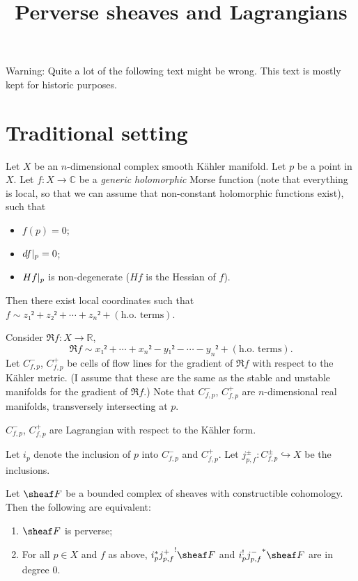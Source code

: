 \documentclass[english]{short-notes}
\title{Perverse sheaves and Lagrangians}
\newcommand\me{\normalcolor}
\newcommand\david{\color{black!60!green}}
\let\David\david
\begin{document}
\maketitle

{\noindent\color{red}\Large Warning: Quite a lot of the following text might be wrong.
This text is mostly kept for historic purposes.}

\section{Traditional setting}

\david
Let $X$ be an $n$-dimensional complex smooth Kähler manifold.
Let $p$ be a point in $X$.
Let $f\colon X → ℂ$ be a \emph{generic} \emph{holomorphic} Morse function (note that everything is local, so that we can assume that non-constant holomorphic functions exist), such that
\begin{itemize}
    \item $f(p) = 0$;
    \item $\res{df}p = 0$;
    \item $\res{Hf}p $ is non-degenerate \me($Hf$ is the Hessian of $f$)\david.
\end{itemize}
Then there exist local coordinates such that $f \sim z₁² + z₂² + \dotsb + z_n² + (\text{h.o.\ terms})$.

Consider $\Re f\colon X → ℝ$,
\[
\Re f \sim x₁² + \dotsb + x_n² - y₁² - \dotsb -y_n² + (\text{h.o.\ terms}).
\]
Let $C_{f,p}^-$, $C_{f,p}^+$ be cells of flow lines for the gradient of $\Re f$ with respect to the Kähler metric.
\me(I assume that these are the same as the stable and unstable manifolds for the gradient of $\Re f$.)
\David
Note that $C_{f,p}^-$, $C_{f,p}^+$ are $n$-dimensional real manifolds, transversely intersecting at $p$.

\begin{Prop}
    $C_{f,p}^-$, $C_{f,p}^+$ are Lagrangian with respect to the Kähler form.
\end{Prop}

Let $i_p$ denote the inclusion of $p$ into $C_{f,p}^-$ and $C_{f,p}^+$.
Let $j_{p,f}^\pm\colon C_{f,p}^\pm \hookrightarrow X$ be the inclusions.

\begin{Thm}
    Let $\sheaf F$ be a bounded complex of sheaves with constructible cohomology.
    Then the following are equivalent:
    \begin{enumerate}
        \item $\sheaf F$ is perverse;
        \item For all $p ∈ X$ and $f$ as above, $i_p^* {j_{p,f}^+}^! \sheaf F$ and $i_p^!{j_{p,f}^-}^* \sheaf F$ are in degree $0$.
    \end{enumerate}
\end{Thm}
\end{document}
